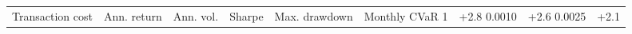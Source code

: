 \begin{tabular}{rlllllll}
\toprule
Transaction cost & Ann. return & Ann. vol. & Sharpe & Max. drawdown & Monthly CVaR 1%
 & +2.8%
0.0010 & +2.6%
0.0025 & +2.1%
\bottomrule
\end{tabular}
